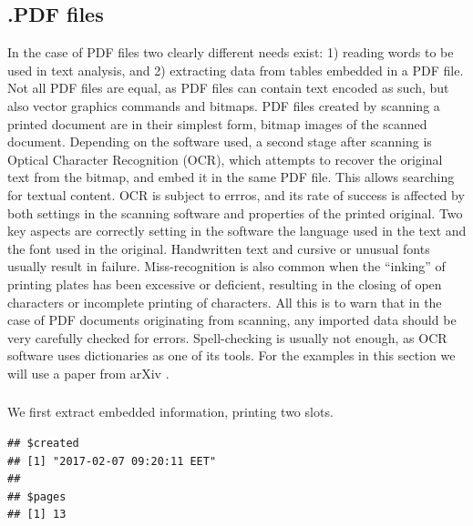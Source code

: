 \documentclass[krantz2,ChapterTOCs]{krantz}\usepackage{knitr}
\begin{document}
\subsection{.PDF files}

In the case of PDF files two clearly different needs exist: 1) reading words to be used in text analysis, and 2) extracting data from tables embedded in a PDF file. Not all PDF files are equal, as PDF files can contain text encoded as such, but also vector graphics commands and bitmaps. PDF files created by scanning a printed document are in their simplest form, bitmap images of the scanned document. Depending on the software used, a second stage after scanning is Optical Character Recognition (OCR), which attempts to recover the original text from the bitmap, and embed it in the same PDF file. This allows searching for textual content. OCR is subject to errros, and its rate of success is affected by both settings in the scanning software and properties of the printed original. Two key aspects are correctly setting in the software the language used in the text and the font used in the original. Handwritten text and cursive or unusual fonts usually result in failure. Miss-recognition is also common when the ``inking'' of printing plates has been excessive or deficient, resulting in the closing of open characters or incomplete printing of characters. All this is to warn that in the case of PDF documents originating from scanning, any imported data should be very carefully checked for errors. Spell-checking is usually not enough, as OCR software uses dictionaries as one of its tools. For the examples in this section we will use a paper from arXiv \autocite{Sagi2017}.

\subsubsection[pdftools]{}

We first extract embedded information, printing two slots.

\begin{knitrout}\footnotesize
{}\color{fgcolor}\begin{kframe}
\begin{alltt}
 \hlkwb{<-} \hlstd{(}\hlstd{)}
\hlstd{my.info[}\hlstd{(}\hlstd{,} \hlstd{)]}
\end{alltt}
\begin{verbatim}
## $created
## [1] "2017-02-07 09:20:11 EET"
## 
## $pages
## [1] 13
\end{verbatim}
\end{kframe}
\end{knitrout}
\end{document}
